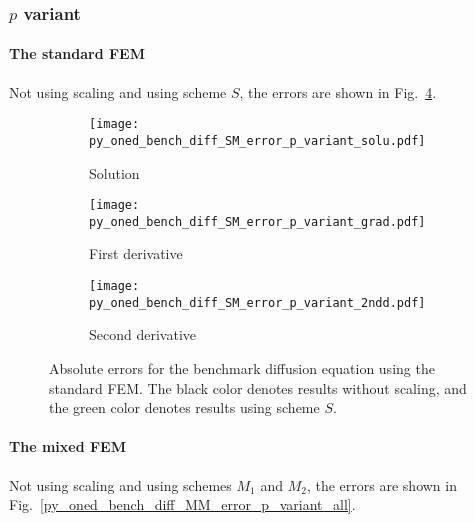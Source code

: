 \documentclass[review,3p]{elsarticle}
\begin{document}
\subsubsection{$p$ variant}

\paragraph{The standard FEM}

Not using scaling and using scheme $S$, the errors are shown in Fig.~\ref{py_oned_bench_diff_SM_error_p_variant}. 

\begin{figure}[!ht]
    \begin{subfigure}{5.5cm}
        \texttt{[image: py\_oned\_bench\_diff\_SM\_error\_p\_variant\_solu.pdf]}
        \caption{Solution}
        \label{py_oned_bench_diff_SM_error_p_variant_solu}
    \end{subfigure}
    \hspace{-0.2cm}
    \begin{subfigure}{5.5cm}
        \texttt{[image: py\_oned\_bench\_diff\_SM\_error\_p\_variant\_grad.pdf]}
        \caption{First derivative}
        \label{py_oned_bench_diff_SM_error_p_variant_grad}
    \end{subfigure}
    \hspace{-0.2cm}
    \begin{subfigure}{5.5cm}
        \texttt{[image: py\_oned\_bench\_diff\_SM\_error\_p\_variant\_2ndd.pdf]}
        \caption{Second derivative}
        \label{py_oned_bench_diff_SM_error_p_variant_2ndd}
    \end{subfigure}
\caption{Absolute errors for the benchmark diffusion equation using the standard FEM. The black color denotes results without scaling, and the green color denotes results using scheme $S$.}
\label{py_oned_bench_diff_SM_error_p_variant}
\end{figure}


\paragraph{The mixed FEM}
Not using scaling and using schemes $M_1$ and $M_2$, the errors are shown in Fig.~\ref{py_oned_bench_diff_MM_error_p_variant_all}. 
\end{document}
